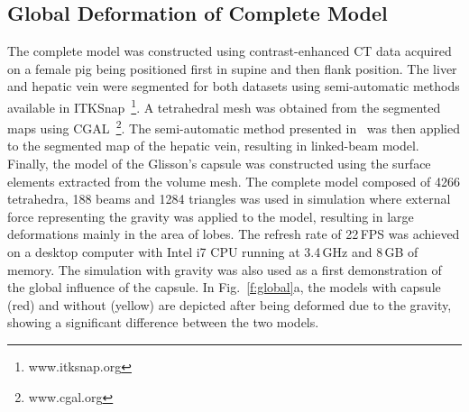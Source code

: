 



\subsection{Global Deformation of Complete Model}
The complete model was constructed using contrast-enhanced CT data acquired on a female pig
being positioned first in supine and then flank position.
The liver and hepatic vein were segmented for both datasets  using semi-automatic methods available in ITKSnap~\footnote{www.itksnap.org}.
A tetrahedral mesh was obtained from the segmented maps using CGAL~\footnote{www.cgal.org}.
The semi-automatic method presented in~\cite{Peterlik2012} was
then applied to the segmented map of the hepatic vein, resulting in linked-beam model.
Finally, the model of the Glisson's capsule was constructed using the surface elements extracted from the volume mesh.
The complete model composed of 4266 tetrahedra, 188 beams and 1284 triangles was 
used in simulation where external force representing the gravity was applied to the model,
resulting in large deformations mainly in the area of lobes. The refresh rate of 22\,FPS
was achieved on a desktop computer with Intel i7 CPU running at 3.4\,GHz and 8\,GB of memory.
The simulation with gravity was also used as a first demonstration of the global influence of the capsule.
In Fig.~\ref{f:global}a, the models with capsule (red) and without (yellow) are depicted after being
deformed due to the gravity, showing a significant difference between the two models.



